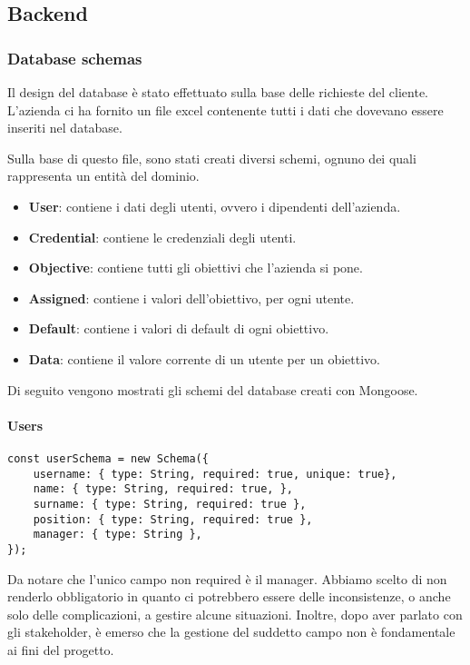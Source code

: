 
\subsection{Backend}

\subsubsection{Database schemas}

Il design del database è stato effettuato sulla base delle richieste del cliente.
L'azienda ci ha fornito un file excel contenente tutti i dati che dovevano essere inseriti nel database.

Sulla base di questo file, sono stati creati diversi schemi, ognuno dei quali rappresenta un entità del dominio.

\begin{itemize}
    \item \textbf{User}: contiene i dati degli utenti, ovvero i dipendenti dell'azienda.
    \item \textbf{Credential}: contiene le credenziali degli utenti.
    \item \textbf{Objective}: contiene tutti gli obiettivi che l'azienda si pone.
    \item \textbf{Assigned}: contiene i valori dell'obiettivo, per ogni utente.
    \item \textbf{Default}: contiene i valori di default di ogni obiettivo.
    \item \textbf{Data}: contiene il valore corrente di un utente per un obiettivo.
\end{itemize}

Di seguito vengono mostrati gli schemi del database creati con Mongoose.

\paragraph{Users}

\begin{verbatim}
const userSchema = new Schema({
    username: { type: String, required: true, unique: true},
    name: { type: String, required: true, },
    surname: { type: String, required: true },
    position: { type: String, required: true },
    manager: { type: String },
});
\end{verbatim}

Da notare che l'unico campo non required è il manager. Abbiamo scelto di non renderlo obbligatorio in quanto
ci potrebbero essere delle inconsistenze, o anche solo delle complicazioni, a gestire alcune situazioni.
Inoltre, dopo aver parlato con gli stakeholder, è emerso che la gestione del suddetto campo non è fondamentale 
ai fini del progetto.

